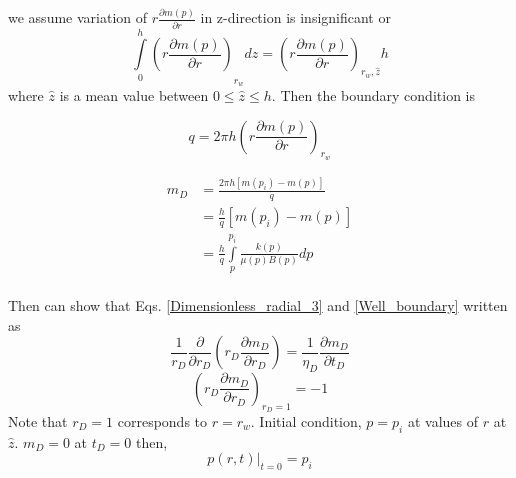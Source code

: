 \documentclass{llncs}
\numberwithin{equation}{section}
\numberwithin{figure}{section}
\numberwithin{table}{section}
\begin{document}
     we assume  variation of $r\frac{\partial m\left( p \right)}{\partial r}$ in z-direction is insignificant or
    \begin{equation*}
    {{\int\limits_{0}^{h}{\left( r\frac{\partial m\left( p \right)}{\partial r} \right)}}_{{{r}_{w}}}}dz={{\left( r\frac{\partial m\left( p \right)}{\partial r} \right)}_{{{r}_{w}},\widehat{z}}}h
    \end{equation*}
    where $\widehat{z}$ is a mean value between $0\leq \widehat{z} \leq h$. Then the boundary condition is


    \begin{equation}
        q=2\pi h{{\left( r\frac{\partial m\left( p \right)}{\partial r} \right)}_{{{r}_{w}}}}
        \label{Well_boundary}
    \end{equation}

    \begin{equation}
        \begin{split}
         {{m}_{D}}&=\frac{2\pi h\left[ m\left( {{p}_{i}} \right)-m\left( p \right) \right]}{q} \\
        & =\frac{h}{q}\left[ m\left( {{p}_{i}} \right)-m\left( p \right) \right] \\
        & =\frac{h}{q}\int\limits_{p}^{{{p}_{i}}}{\frac{k\left( p \right)}{\mu \left( p \right)B\left( p \right)}dp} \\
        \end{split}
        \label{mD_definition}
    \end{equation}

    Then  can show that Eqs. \ref{Dimensionless_radial_3} and \ref{Well_boundary} written as
    \begin{equation}
            \frac{1}{{{r}_{D}}}\frac{\partial }{\partial {{r}_{D}}}\left( {{r}_{D}}\frac{\partial {{m}_{D}}}{\partial {{r}_{D}}} \right)=\frac{1}{{{\eta }_{D}}}\frac{\partial {{m}_{D}}}{\partial {{t}_{D}}}
        \label{Dimensionless_radial_4}
    \end{equation}
    \begin{equation}
            {{\left( {{r}_{D}}\frac{\partial {{m}_{D}}}{\partial {{r}_{D}}} \right)}_{{{r}_{D}}=1}}=-1
        \label{Well_boundary_2}
    \end{equation}
    Note that $r_{D}=1$ corresponds to $r=r_{w}$.
    Initial condition, $p=p_{i}$ at values of $r$ at $\widehat{z}$.
    $m_{D}=0$ at $t_{D}=0$ then,
    \begin{equation}
        {{\left. p\left( r,t \right) \right|}_{t=0}}={{p}_{i}}
        \label{initial_condition}
    \end{equation}
\end{document}
